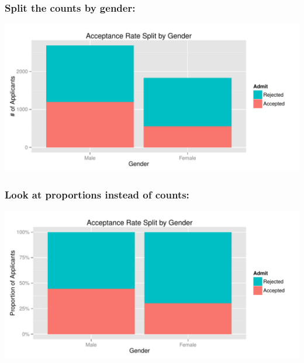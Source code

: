 \documentclass[handout]{beamer}
\begin{document}
\begin{frame}
\frametitle{Split the counts by gender:}

\begin{center}
\includegraphics[width=\textwidth]{figure/gender-accpt-count.pdf}
\end{center}

\end{frame}



\begin{frame}
\frametitle{Look at proportions instead of counts:}

\begin{center}
\includegraphics[width=\textwidth]{figure/gender-accpt.pdf}
\end{center}

\end{frame}
\end{document}
